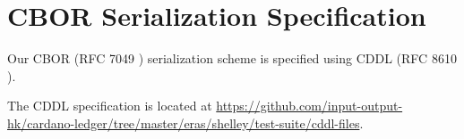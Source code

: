 \section{CBOR Serialization Specification}
\label{sec:cddl}

Our CBOR (RFC 7049 \cite{rfcCBOR})
serialization scheme is specified using
CDDL (RFC 8610 \cite{rfcCDDL}).

The CDDL specification is located at
\url{https://github.com/input-output-hk/cardano-ledger/tree/master/eras/shelley/test-suite/cddl-files}.

% 
